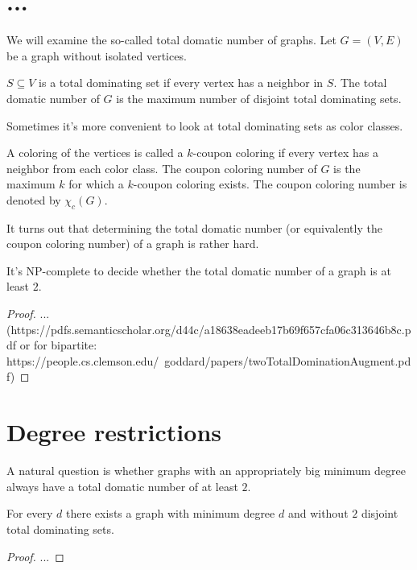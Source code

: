 \section{...}

We will examine the so-called total domatic number of graphs.
Let $G = (V, E)$ be a graph without isolated vertices.

\begin{definition}
  $S \subseteq V$ is a total dominating set if every vertex has a neighbor in
  $S$. The total domatic number of $G$ is the maximum number of disjoint total
  dominating sets.
\end{definition}

Sometimes it's more convenient to look at total dominating sets as color classes.

\begin{definition}
  A coloring of the vertices is called a $k$-coupon coloring if every vertex
  has a neighbor from each color class. The coupon coloring number of $G$ is
  the maximum $k$ for which a $k$-coupon coloring exists. The coupon coloring
  number is denoted by $\chi_c(G)$.
\end{definition}

It turns out that determining the total domatic number (or equivalently the
coupon coloring number) of a graph is rather hard.

\begin{thm}
  It's NP-complete to decide whether the total domatic number of
  a graph is at least $2$.
\end{thm}

\begin{proof}
  ...
  (https://pdfs.semanticscholar.org/d44c/a18638eadeeb17b69f657cfa06c313646b8c.pdf
  or for bipartite:
  https://people.cs.clemson.edu/~goddard/papers/twoTotalDominationAugment.pdf)
\end{proof}

\section{Degree restrictions}

A natural question is whether graphs with an appropriately big minimum degree
always have a total domatic number of at least $2$.

\begin{thm}
  For every $d$ there exists a graph with minimum degree $d$ and without $2$
  disjoint total dominating sets.
\end{thm}
\begin{proof}
  ...
\end{proof}

